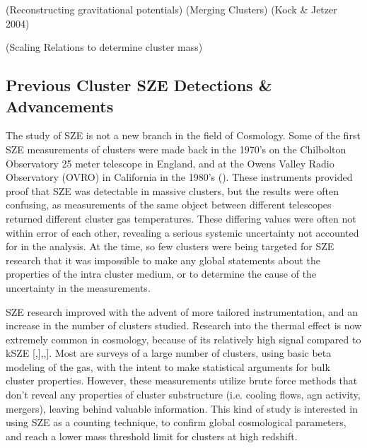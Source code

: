 \documentclass[manuscript]{aastex}
\begin{document}

(Reconstructing gravitational potentials)
(Merging Clusters) 
   (Kock \& Jetzer 2004)
    
(Scaling Relations to determine cluster mass) 




\subsection{Previous Cluster SZE Detections \& Advancements}

The study of SZE is not a new branch in the field of Cosmology. Some of the first SZE measurements of clusters were made back in the 1970's on the Chilbolton Observatory 25 meter telescope in England, and at the Owens Valley Radio Observatory (OVRO) in California in the 1980's (\cite{Birkinshaw1999}). These instruments provided proof that SZE was detectable in massive clusters, but the results were often confusing, as measurements of the same object between different telescopes returned different cluster gas temperatures. These differing values were often not within error of each other, revealing a serious systemic uncertainty not accounted for in the analysis. At the time, so few clusters were being targeted for SZE research that it was impossible to make any global statements about the properties of the intra cluster medium, or to determine the cause of the uncertainty in the measurements. 

SZE research improved with the advent of more tailored instrumentation, and an increase in the number of clusters studied. Research into the thermal effect is now extremely common in cosmology, because of its relatively high signal compared to kSZE [\cite{Benson2013},\cite{Saliwanchik2015}],\cite{Bleem2015},\cite{Planck2016}]. Most are surveys of a large number of clusters, using basic beta modeling of the gas, with the intent to make statistical arguments for bulk cluster properties. However, these measurements utilize brute force methods that don't reveal any properties of cluster substructure (i.e. cooling flows, agn activity, mergers), leaving behind valuable information. This kind of study is interested in using SZE as a counting technique, to confirm global cosmological parameters, and reach a lower mass threshold limit for clusters at high redshift. 
\end{document}
